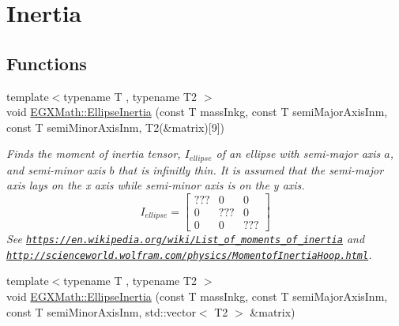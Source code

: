 \hypertarget{group___e_g_x_math-_geometry-2_d-_ellipse-_inertia}{}\section{Inertia}
\label{group___e_g_x_math-_geometry-2_d-_ellipse-_inertia}
\subsection*{Functions}
\begin{DoxyCompactItemize}
\item 
{\footnotesize template$<$typename T , typename T2 $>$ }\\void \mbox{\hyperlink{group___e_g_x_math-_geometry-2_d-_ellipse-_inertia_ga10a3049c2f04b50f271fb01dc62e4cf8}{E\+G\+X\+Math\+::\+Ellipse\+Inertia}} (const T mass\+Inkg, const T semi\+Major\+Axis\+Inm, const T semi\+Minor\+Axis\+Inm, T2(\&matrix)\mbox{[}9\mbox{]})
\begin{DoxyCompactList}\small\item\em Finds the moment of inertia tensor, $I_{ellipse}$ of an ellipse with semi-\/major axis $a$, and semi-\/minor axis $b$ that is infinitly thin. It is assumed that the semi-\/major axis lays on the x axis while semi-\/minor axis is on the y axis. \[ I_{ellipse}=\begin{bmatrix} ??? & 0 & 0\\ 0 & ??? & 0\\ 0 & 0 & ??? \end{bmatrix} \] See \href{https://en.wikipedia.org/wiki/List_of_moments_of_inertia}{\tt https\+://en.\+wikipedia.\+org/wiki/\+List\+\_\+of\+\_\+moments\+\_\+of\+\_\+inertia} and \href{http://scienceworld.wolfram.com/physics/MomentofInertiaHoop.html}{\tt http\+://scienceworld.\+wolfram.\+com/physics/\+Momentof\+Inertia\+Hoop.\+html}. \end{DoxyCompactList}\item 
{\footnotesize template$<$typename T , typename T2 $>$ }\\void \mbox{\hyperlink{group___e_g_x_math-_geometry-2_d-_ellipse-_inertia_ga4d9a8fec47d22c25481db36bf475905a}{E\+G\+X\+Math\+::\+Ellipse\+Inertia}} (const T mass\+Inkg, const T semi\+Major\+Axis\+Inm, const T semi\+Minor\+Axis\+Inm, std\+::vector$<$ T2 $>$ \&matrix)

\end{DoxyCompactItemize}
